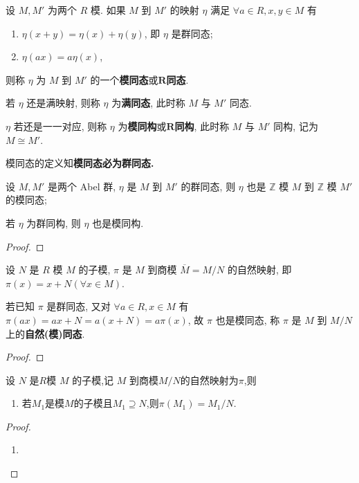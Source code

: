 \documentclass[../../main.tex]{subfiles}%
\begin{document}
\begin{definition}
设 \( M, M' \) 为两个 \( R \) 模. 如果 \( M \) 到 \( M' \) 的映射 \( \eta \) 满足 \( \forall a \in R, x, y \in M \) 有
\begin{enumerate}[(1)]
\item \( \eta(x + y) = \eta(x) + \eta(y) \), 即 \( \eta \) 是群同态;
\item \( \eta(ax) = a\eta(x) \),
\end{enumerate}
则称 \( \eta \) 为 \( M \) 到 \( M' \) 的一个\textbf{模同态}或\(\boldsymbol{R}\)\textbf{同态}.

若 \( \eta \) 还是满映射, 则称 \( \eta \) 为\textbf{满同态}, 此时称 \( M \) 与 \( M' \) 同态.

\( \eta \) 若还是一一对应, 则称 \( \eta \) 为\textbf{模同构}或\(\boldsymbol{R}\)\textbf{同构}, 此时称 \( M \) 与 \( M' \) 同构, 记为 \( M \cong M' \).
\end{definition}
\begin{remark}
模同态的定义知\textbf{模同态必为群同态.}
\end{remark}

\begin{proposition}\label{proposition:抽象代数-例题1.6.10}
设 \( M, M' \) 是两个 Abel 群, \( \eta \) 是 \( M \) 到 \( M' \) 的群同态, 则 \( \eta \) 也是 \( \mathbb{Z} \) 模 \( M \) 到 \( \mathbb{Z} \) 模 \( M' \) 的模同态; 

若 \( \eta \) 为群同构, 则 \( \eta \) 也是模同构.
\end{proposition}
\begin{proof}

\end{proof}

\begin{theorem}\label{theorem:自然模同态的良定义}
设 \( N \) 是 \( R \) 模 \( M \) 的子模, \( \pi \) 是 \( M \) 到商模 \( \overline{M} = M/N \) 的自然映射, 即 \( \pi(x) = x + N (\forall x \in M) \). 

若已知 \( \pi \) 是群同态, 又对 \( \forall a \in R, x \in M \) 有 \( \pi(ax) = ax + N = a(x + N) = a\pi(x) \), 故 \( \pi \) 也是模同态, 称 \( \pi \) 是 \( M \) 到 \( M/N \) 上的\textbf{自然(模)同态}.
\end{theorem}
\begin{proof}

\end{proof}

\begin{proposition}\label{proposition:自然模同态的基本性质}
设 \( N \) 是$R$模 \( M \) 的子模,记 \( M \) 到商模\( M/N \)的自然映射为$\pi$,则
\begin{enumerate}[(1)]
\item\label{proposition:自然模同态的基本性质-1} 若$M_1$是模$M$的子模且$M_1\supseteq N$,则$\pi(M_1)=M_1/N.$

\end{enumerate}
\end{proposition}
\begin{proof}
\begin{enumerate}[(1)]
\item 

\end{enumerate}
\end{proof}
\end{document}
